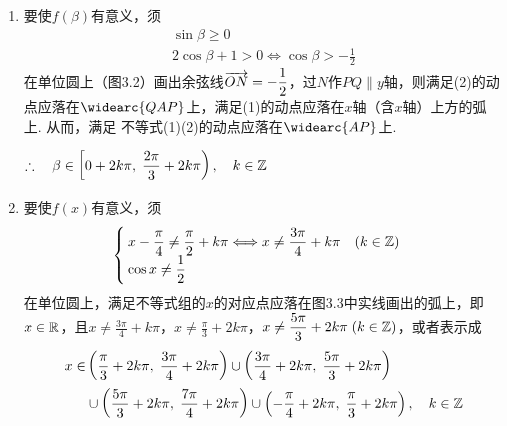 \begin{solution}
\begin{enumerate}[(1)]
\item 要使$f(\beta)$有意义，须
\begin{align}
    \sin\beta\ge 0 \tag{1}\\
    2\cos\beta +1>0\Longleftrightarrow \cos\beta>-\frac{1}{2}\tag{2}
\end{align}
在单位圆上（图3.2）画出余弦线$\overrightarrow{ON}=-\dfrac{1}{2}$，过$N$作$PQ\parallel y$轴，则满足(2)的动点应落在$\widearc{QAP}$上，满足(1)的动点应落在$x$轴（含$x$轴）上方的弧上. 从而，满足 不等式(1)(2)的动点应落在$\widearc{AP}$上.

$\therefore\quad \beta\in \left[0+2k\pi,\; \dfrac{2\pi}{3}+2k\pi\right),\quad k\in\mathbb{Z}$

\item 要使$f(x)$有意义，须
\[\begin{cases}
    x-\dfrac{\pi}{4}\ne\dfrac{\pi}{2}+k\pi\Longleftrightarrow x\ne \dfrac{3\pi}{4}+k\pi\quad (k\in\mathbb{Z})\\
    \cos x\ne \dfrac{1}{2}
\end{cases}\]
在单位圆上，满足不等式组的$x$的对应点应落在图3.3中实线画出的弧上，即$x\in\mathbb{R}$，且$x\ne \frac{3\pi}{4}+k\pi$，$x\ne \frac{\pi}{3}+2k\pi$，$x\ne \dfrac{5\pi}{3}+2k\pi\; (k\in\mathbb{Z})$，或者表示成
\[\begin{split}
x\in &\left(\dfrac{\pi}{3}+2k\pi,\; \dfrac{3\pi}{4}+2k\pi\right)\cup \left(\dfrac{3\pi}{4}+2k\pi,\; \dfrac{5\pi}{3}+2k\pi\right)\\
&\cup \left(\dfrac{5\pi}{3}+2k\pi,\; \dfrac{7\pi}{4}+2k\pi\right)\cup \left(-\dfrac{\pi}{4}+2k\pi,\; \dfrac{\pi}{3}+2k\pi\right),\quad k\in\mathbb{Z}
\end{split}\]


\end{enumerate}
\end{solution}
